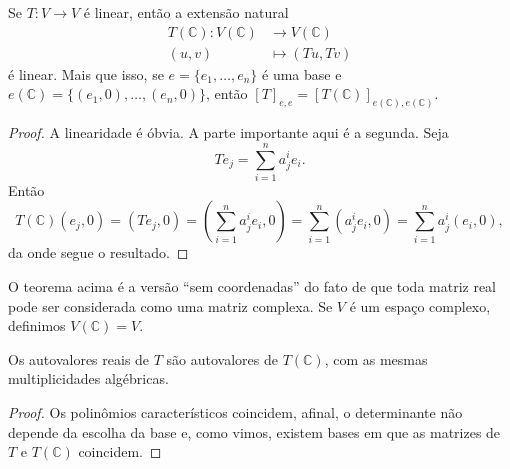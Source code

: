 \begin{proposition}
    Se $T \colon V \to V$ é linear, então a extensão natural \begin{equation}
        \begin{split}
            T(\mathbb{C}) \colon V(\mathbb{C}) &\to V(\mathbb{C}) \\ (u,v) &\mapsto (Tu, Tv)
        \end{split}
    \end{equation} é linear. Mais que isso, se $e = \{e_1, \dots, e_n\}$ é uma base e $e(\mathbb{C}) = \{(e_1, 0), \dots, (e_n, 0)\}$, então $[T]_{e,e} = [T(\mathbb{C})]_{e(\mathbb{C}),e(\mathbb{C})}$.
\end{proposition}
\begin{proof}
    A linearidade é óbvia. A parte importante aqui é a segunda. Seja \begin{equation}
        Te_j = \sum_{i = 1}^n a^i_j e_i.
    \end{equation} Então \begin{equation}
        T(\mathbb{C})(e_j, 0) = (Te_j, 0) = \left(\sum_{i = 1}^n a^i_j e_i, 0\right) = \sum_{i = 1}^n (a^i_j e_i, 0) = \sum_{i = 1}^n a^i_j (e_i, 0),
    \end{equation} da onde segue o resultado.
\end{proof}

O teorema acima é a versão ``sem coordenadas'' do fato de que toda matriz real pode ser considerada como uma matriz complexa. Se $V$ é um espaço complexo, definimos $V(\mathbb{C}) = V$.

\begin{lemma}
    Os autovalores reais de $T$ são autovalores de $T(\mathbb{C})$, com as mesmas multiplicidades algébricas.
\end{lemma}
\begin{proof}
    Os polinômios característicos coincidem, afinal, o determinante não depende da escolha da base e, como vimos, existem bases em que as matrizes de $T$ e $T(\mathbb{C})$ coincidem.
\end{proof}


